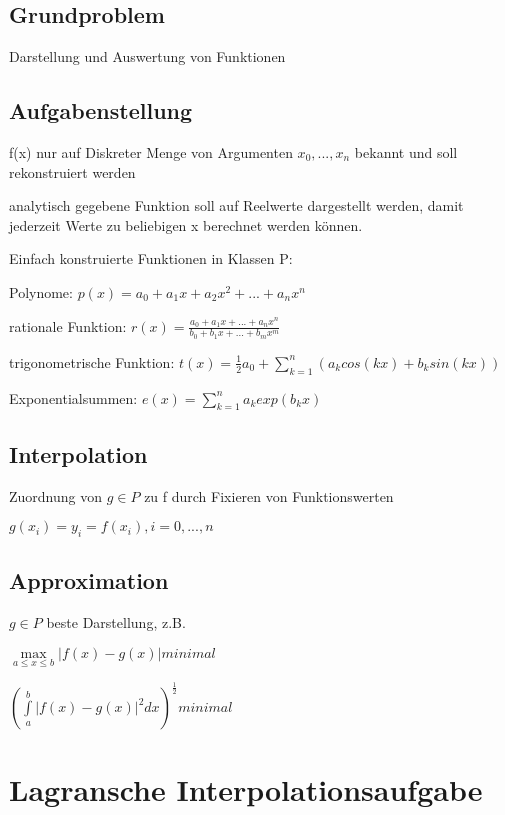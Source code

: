 \documentclass[12pt,a4paper]{article} %
\begin{document}
	\subsection{Grundproblem}
	
	Darstellung und Auswertung von Funktionen
	
	\subsection{Aufgabenstellung}
	
	f(x) nur auf Diskreter Menge von Argumenten $x_0, ..., x_n$ bekannt und soll rekonstruiert werden
	
	analytisch gegebene Funktion soll auf Reelwerte dargestellt werden, damit jederzeit Werte zu beliebigen x berechnet werden können.
	
	Einfach konstruierte Funktionen in Klassen P:
	
	Polynome: $p(x) = a_0 + a_1x + a_2x^2 + ... + a_nx^n$
	
	rationale Funktion: $r(x) = \frac{a_0 + a_1x + ... + a_nx^n}{b_0 + b_1x + ... + b_mx^m}$
	
	trigonometrische Funktion: $t(x) = \frac{1}{2}a_0 + \sum\limits_{k = 1}^{n}(a_kcos(kx) + b_ksin(kx))$
	
	Exponentialsummen: $e(x) = \sum\limits_{k = 1}^{n}a_kexp(b_kx)$
	
	\subsection{Interpolation}
	
	Zuordnung von $g \in P$ zu f durch Fixieren von Funktionswerten
	
	$g(x_i) = y_i = f(x_i), i = 0, ..., n$
	
	\subsection{Approximation}
	
	$g \in P$ beste Darstellung, z.B. 
	
	$\max\limits_{a \le x \le b}|f(x) - g(x)| minimal$
	
	$(\int\limits_{a}^{b}|f(x) - g(x)|^2dx)^{\frac{1}{2}} minimal$
	
	\newpage
	
	\section{Lagransche Interpolationsaufgabe}
	
\end{document}
